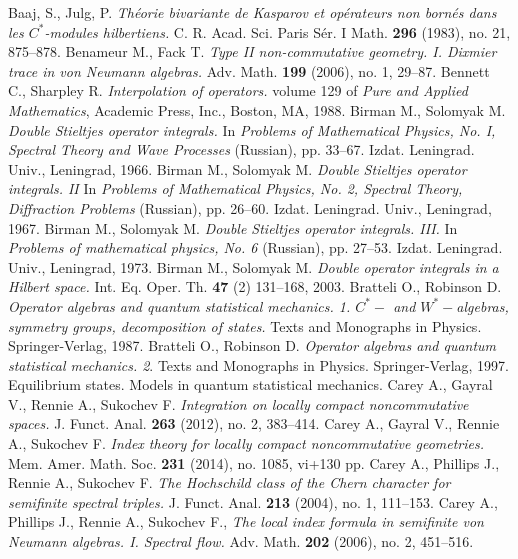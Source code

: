 \begin{thebibliography}{99}
 Baaj, S., Julg, P. {\it Th\'eorie bivariante de Kasparov et op\'erateurs non born\'es dans les $C^*$-modules hilbertiens.} C. R. Acad. Sci. Paris S\'er. I Math. {\bf 296} (1983), no. 21, 875--878.
 Benameur M., Fack T. {\it Type II non-commutative geometry. I. Dixmier trace in von Neumann algebras.} Adv. Math. {\bf 199} (2006), no. 1, 29--87.
 Bennett C., Sharpley R. {\it Interpolation of operators.} volume 129 of {\it Pure and Applied Mathematics}, Academic Press, Inc., Boston, MA, 1988.
 Birman M., Solomyak M. {\it Double Stieltjes operator integrals.} In {\it Problems of Mathematical Physics, No. I, Spectral Theory and Wave Processes} (Russian), pp. 33--67. Izdat. Leningrad. Univ., Leningrad, 1966.
 Birman M., Solomyak M. {\it Double Stieltjes operator integrals. II} In {\em Problems of Mathematical Physics, No. 2, Spectral Theory, Diffraction Problems}  (Russian), pp. 26--60. Izdat. Leningrad. Univ., Leningrad, 1967.
  Birman M., Solomyak M. {\it Double Stieltjes operator integrals. III.} In {\it Problems of mathematical physics, No. 6} (Russian), pp. 27--53. Izdat. Leningrad. Univ., Leningrad, 1973. 
 Birman M., Solomyak M. {\it Double operator integrals in a Hilbert space.} Int. Eq. Oper. Th.  {\bf 47} (2) 131--168, 2003.
 Bratteli O., Robinson D. {\it Operator algebras and quantum statistical mechanics. 1. $C^*-$ and $W^*-$algebras, symmetry groups, decomposition of states.} Texts and Monographs in Physics. Springer-Verlag, 1987.
 Bratteli O., Robinson D. {\it Operator algebras and quantum statistical mechanics. 2}. Texts and Monographs in Physics. Springer-Verlag, 1997.
\newblock Equilibrium states. Models in quantum statistical mechanics.
 Carey A., Gayral V., Rennie A., Sukochev F. {\it Integration on locally compact noncommutative spaces.} J. Funct. Anal. {\bf 263} (2012), no. 2, 383--414.
 Carey A., Gayral V., Rennie A., Sukochev F. {\it Index theory for locally compact noncommutative geometries.} Mem. Amer. Math. Soc. {\bf 231} (2014), no. 1085, vi+130 pp.
 Carey A., Phillips J., Rennie A., Sukochev F. {\it The Hochschild class of the Chern character for semifinite spectral triples.} J. Funct. Anal. {\bf 213} (2004), no. 1, 111--153.
 Carey A., Phillips J., Rennie A., Sukochev F., {\it The local index formula in semifinite von Neumann algebras. I. Spectral flow.} Adv. Math. {\bf 202} (2006), no. 2, 451--516. 

\end{thebibliography}
